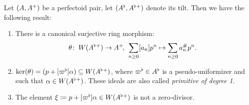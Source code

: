 \begin{lemma}\label{fontainemaplemma}
Let $(A,A{^{+}})$ be a perfectoid pair, let $(A^{\flat},A^{\flat}{^{+}})$ denote its tilt.
Then we have the following result:
\begin{enumerate}
\item There is a canonical surjective ring morphism:
	\[\theta\colon\: W(A^{\flat}{^{+}})\to A{^{+}}\!,\:\:\sum_{n\geq0}[a_n]p^n\mapsto\sum_{n\geq0}a_n^{\#} p^n.\]
\item $\ker(\theta) = (p+[\varpi^{\flat}]\alpha)\subseteq W(A^{\flat}{^{+}})$, where $\varpi^{\flat}\in A^{\flat}$ is a pseudo-uniformizer and such that $\alpha\in W(A^{\flat}{^{+}})$.
	These ideals are also called \emph{primitive of degree 1}.
\item The element $\xi\coloneqq p+[\varpi^{\flat}]\alpha\in W(A^{\flat}{^{+}})$ is not a zero-divisor.
\end{enumerate}

\end{lemma}

